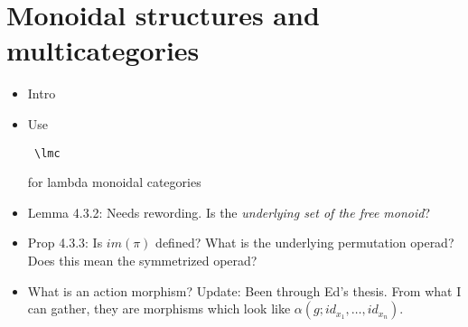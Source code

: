 \documentclass{amsart}
\begin{document}
\section{ Monoidal structures and multicategories}

\begin{itemize}
\item Intro
\item Use \begin{verbatim} \lmc \end{verbatim} for lambda monoidal categories
\item Lemma 4.3.2: Needs rewording. Is the \textit{underlying set of the free monoid}?
\item Prop 4.3.3: Is $im(\pi)$ defined? What is the underlying permutation operad? Does this mean the symmetrized operad?
\item What is an action morphism? Update: Been through Ed's thesis. From what I can gather, they are morphisms which look like $\alpha(g; id_{x_1}, \ldots, id_{x_n})$.

\end{itemize}
\end{document}
